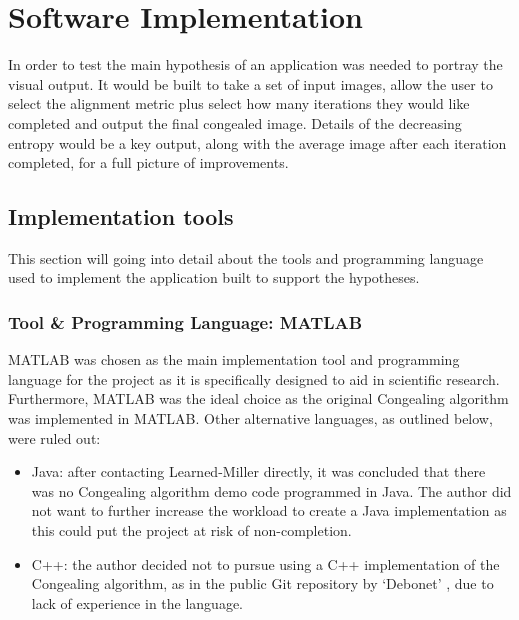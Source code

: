 \chapter{Software Implementation}

In order to test the main hypothesis of  an application was needed to portray the visual output. It would be built to take a set of input images, allow the user to select the alignment metric plus select how many iterations they would like completed and output the final congealed image. Details of the decreasing entropy would be a key output, along with the average image after each iteration completed, for a full picture of improvements.

\section{Implementation tools}

This section will going into detail about the tools and programming language used to implement the application built to support the hypotheses.

\subsection{Tool \& Programming Language: MATLAB}
\label{ssec:matlab}

MATLAB \cite{MATLAB:2016} was chosen as the main implementation tool and programming language for the project as it is specifically designed to aid in scientific research. Furthermore, MATLAB was the ideal choice as the original \Gls{Congealing} algorithm was implemented in MATLAB. Other alternative languages, as outlined below, were ruled out:

\begin{itemize}
  \item Java: after contacting Learned-Miller directly, it was concluded that there was no \Gls{Congealing} algorithm demo code programmed in Java. The author did not want to further increase the workload to create a Java implementation as this could put the project at risk of non-completion.
  \item C++: the author decided not to pursue using a C++ implementation of the \Gls{Congealing} algorithm, as in the public Git repository by `Debonet' \cite{cpp_congealing}, due to lack of experience in the language.
\end{itemize}

